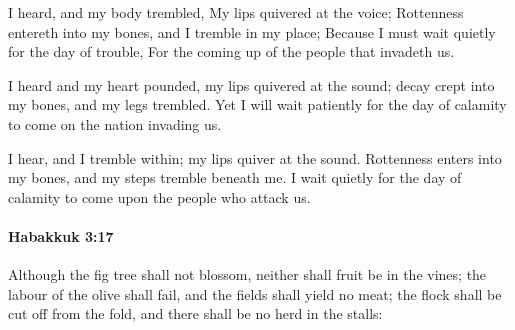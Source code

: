 			\begin{versebox}
					\item[BHS] 
					\item[LXX] 
					\item[ASV] I heard, and my body trembled, My lips quivered at the voice; Rottenness entereth into my bones, and I tremble in my place; Because I must wait quietly for the day of trouble, For the coming up of the people that invadeth us.
					\item[NIV] I heard and my heart pounded, my lips quivered at the sound; decay crept into my bones, and my legs trembled. Yet I will wait patiently for the day of calamity to come on the nation invading us.
					\item[NRSV] I hear, and I tremble within; my lips quiver at the sound. Rottenness enters into my bones, and my steps tremble beneath me. I wait quietly for the day of calamity to come upon the people who attack us.
			\end{versebox}

		\paragraph{Habakkuk 3:17} %
			\label{HABAKKUK-3-17}

			Although the fig tree shall not blossom, neither shall fruit be in the vines; the labour of the olive shall fail, and the fields shall yield no meat; the flock shall be cut off from the fold, and there shall be no herd in the stalls:

